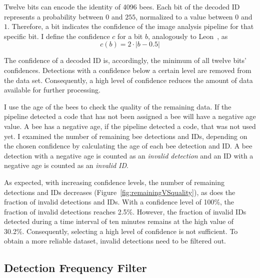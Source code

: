 \footnotetext{}

Twelve bits can encode the identity of 4096 bees.
Each bit of the decoded ID represents a probability between $0$ and $255$, normalized to a value between $0$ and $1$.
Therefore, a bit indicates the confidence of the image analysis pipeline for that specific bit.
I define the confidence $c$ for a bit $b$, analogously to Leon~\textcite[p.~14]{leon2016}, as
\begin{equation}
\label{eq:confidence}
c(b)=2\cdot|b-0.5|
\end{equation}

The confidence of a decoded ID is, accordingly, the minimum of all twelve bits' confidences.
Detections with a confidence below a certain level are removed from the data set.
Consequently, a high level of confidence reduces the amount of data available for further processing.

I use the age of the bees to check the quality of the remaining data.
If the pipeline detected a code that has not been assigned a bee will have a negative age value.
A bee has a negative age, if the pipeline detected a code, that was not used yet.
I examined the number of remaining bee detections and IDs, depending on the chosen confidence by calculating the age of each bee detection and ID.
A bee detection with a negative age is counted as an \emph{invalid detection} and an ID with a negative age is counted as an \emph{invalid ID}.

As expected, with increasing confidence levels, the number of remaining detections and IDs decreases (Figure~\ref{fig:remainingVSquality}), as does the fraction of invalid detections and IDs.
With a confidence level of 100\%, the fraction of invalid detections reaches 2.5\%.
However, the fraction of invalid IDs detected during a time interval of ten minutes remains at the high value of 30.2\%. Consequently, selecting a high level of confidence is not sufficient.
To obtain a more reliable dataset, invalid detections need to be filtered out.


\subsection{Detection Frequency Filter}
\label{subsubsec:dataset:filter}

